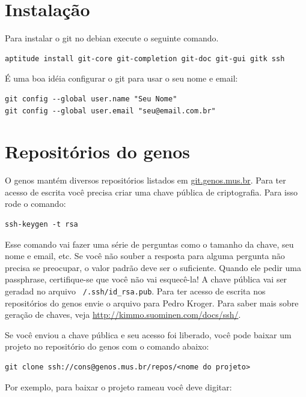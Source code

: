 \documentclass[12pt,brazil]{book}
\begin{document}
\section{Instalação}
\label{sec:instalacao-3}

Para instalar o git no debian execute o seguinte comando.

\begin{verbatim}
aptitude install git-core git-completion git-doc git-gui gitk ssh
\end{verbatim}

É uma boa idéia configurar o git para usar o seu nome e email:

\begin{verbatim}
git config --global user.name "Seu Nome"
git config --global user.email "seu@email.com.br"
\end{verbatim}

\section{Repositórios do genos}
\label{sec:acesso-de-escrita}

O genos mantém diversos repositórios listados em
\url{git.genos.mus.br}. Para ter acesso de escrita você precisa criar
uma chave pública de criptografia. Para isso rode o comando:

\begin{verbatim}
ssh-keygen -t rsa
\end{verbatim}

Esse comando vai fazer uma série de perguntas como o tamanho da chave,
seu nome e email, etc. Se você não souber a resposta para alguma
pergunta não precisa se preocupar, o valor padrão deve ser o
suficiente. Quando ele pedir uma passphrase, certifique-se que você
não vai esquecê-la! A chave pública vai ser geradad no arquivo
\texttt{~/.ssh/id\_rsa.pub}. Para ter acesso de escrita nos
repositórios do genos envie o arquivo para Pedro Kroger. Para saber
mais sobre geração de chaves, veja
\url{http://kimmo.suominen.com/docs/ssh/}.

Se você enviou a chave pública e seu acesso foi liberado, você pode
baixar um projeto no repositório do genos com o comando abaixo:

\begin{verbatim}
git clone ssh://cons@genos.mus.br/repos/<nome do projeto>
\end{verbatim}

Por exemplo, para baixar o projeto rameau você deve
digitar:
\end{document}
